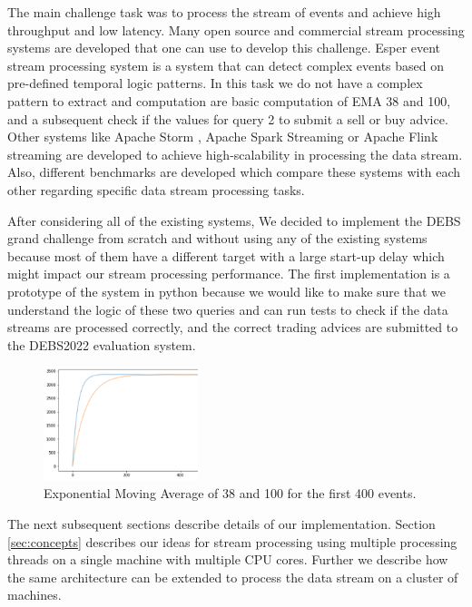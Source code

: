 The main challenge task was to process the stream of events and achieve high throughput and low latency. 
Many open source and commercial stream processing systems are developed that one can use to develop this challenge. 
Esper event stream processing system \cite{Bernhardt2007} is a system that can detect complex events based on pre-defined temporal logic patterns. 
In this task we do not have a complex pattern to extract and computation are basic computation of EMA 38 and 100, and a subsequent check if the values for 
query 2 to submit a sell or buy advice. Other systems like Apache Storm \cite{8288619}, Apache Spark Streaming \cite{zaharia2010spark} or 
Apache Flink streaming \cite{alexandrov2014stratosphere} are developed to achieve high-scalability in processing the data stream. 
Also, different benchmarks are developed \cite{DBLP:conf/cloud/SikdarTJ17} \cite{8701904} which compare these systems with each other regarding specific data 
stream processing tasks. 

After considering all of the existing systems, We decided to implement the DEBS grand challenge from scratch and without using any of the existing systems 
because most of them have a different target with a large start-up delay which might impact our stream processing performance. The first implementation is a 
prototype of the system in python because we would like to make sure that we understand the logic of these two queries and can run tests to check if the 
data streams are processed correctly, and the correct trading advices are submitted to the DEBS2022 evaluation system. 



\begin{figure}[!ht]
    \begin{center}
        \includegraphics[width=0.4\textwidth]{./images/query2_example_200.png}
        \caption{Exponential Moving Average of 38 and 100 for the first 400 events.}
        \label{fig:EMA200}
    \end{center}
\end{figure}


The next subsequent sections describe details of our implementation. Section \ref{sec:concepts} describes our ideas for 
stream processing using multiple processing threads on a single machine with multiple CPU cores. Further we describe how the same 
architecture can be extended to process the data stream on a cluster of machines.  




